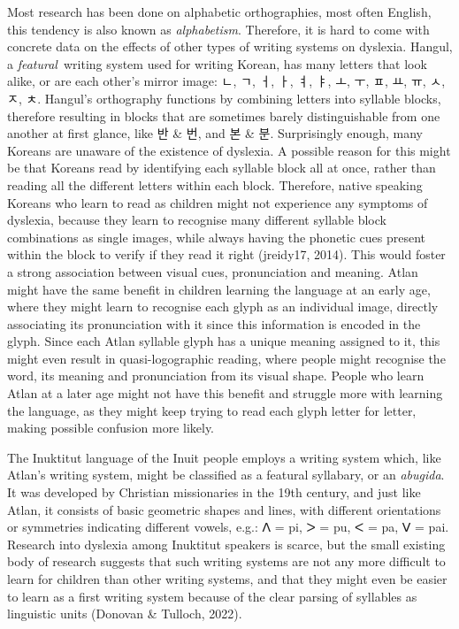 Most research has been done on alphabetic orthographies, most often English, this tendency is also known as {\it alphabetism}. Therefore, it is hard to come with concrete data on the effects of other types of writing systems on dyslexia. Hangul, a {\it featural}\ writing system used for writing Korean, has many letters that look alike, or are each other’s mirror image: ㄴ, ㄱ, ㅓ, ㅏ, ㅕ, ㅑ, ㅗ, ㅜ, ㅍ, ㅛ, ㅠ, ㅅ, ㅈ, ㅊ. Hangul’s orthography functions by combining letters into syllable blocks, therefore resulting in blocks that are sometimes barely distinguishable from one another at first glance, like 반 \& 번, and 본 \& 분. Surprisingly enough, many Koreans are unaware of the existence of dyslexia. A possible reason for this might be that Koreans read by identifying each syllable block all at once, rather than reading all the different letters within each block. Therefore, native speaking Koreans who learn to read as children might not experience any symptoms of dyslexia, because they learn to recognise many different syllable block combinations as single images, while always having the phonetic cues present within the block to verify if they read it right (jreidy17, 2014). This would foster a strong association between visual cues, pronunciation and meaning. Atlan might have the same benefit in children learning the language at an early age, where they might learn to recognise each glyph as an individual image, directly associating its pronunciation with it since this information is encoded in the glyph. Since each Atlan syllable glyph has a unique meaning assigned to it, this might even result in quasi-logographic reading, where people might recognise the word, its meaning and pronunciation from its visual shape. People who learn Atlan at a later age might not have this benefit and struggle more with learning the language, as they might keep trying to read each glyph letter for letter, making possible confusion more likely. 

The Inuktitut language of the Inuit people employs a writing system which, like Atlan’s writing system, might be classified as a featural syllabary, or an {\it abugida}. It was developed by Christian missionaries in the 19th century, and just like Atlan, it consists of basic geometric shapes and lines, with different orientations or symmetries indicating different vowels, e.g.: ᐱ = pi, ᐳ = pu, ᐸ = pa, ᐯ = pai. Research into dyslexia among Inuktitut speakers is scarce, but the small existing body of research suggests that such writing systems are not any more difficult to learn for children than other writing systems, and that they might even be easier to learn as a first writing system because of the clear parsing of syllables as linguistic units (Donovan \& Tulloch, 2022).  

